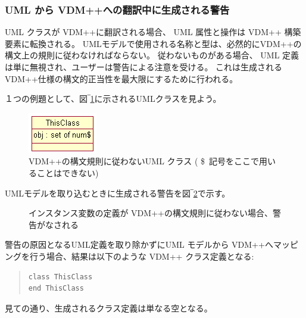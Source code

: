 \documentclass[\pformat,12pt]{jarticle}
\newcommand{\vdmpp}{VDM++}
\begin{document}
\subsubsection*{ UML から \vdmpp{}への翻訳中に生成される警告}


 UML クラスが \vdmpp{}に翻訳される場合、 UML 属性と操作は \vdmpp{} 構築要素に転換される。
UMLモデルで使用される名称と型は、必然的に\vdmpp{}の構文上の規則に従わなければならない。
従わないものがある場合、 UML 定義は単に無視され、ユーザーは警告による注意を受ける。
これは生成される \vdmpp{}仕様の構文的正当性を最大限にするために行われる。

１つの例題として、図‾\ref{fig:noncompliance}に示されるUMLクラスを見よう。

\begin{figure}[htb]
\begin{center}
\mbox{}
\vspace{0.5cm}
\includegraphics{noncompliance}
\caption{\vdmpp{}の構文規則に従わないUML クラス ( \$\ 記号をここで用いることはできない)　\label{fig:noncompliance}}
\end{center}
\end{figure}

UMLモデルを取り込むときに生成される警告を図‾\ref{fig:warning}で示す。

\begin{figure}[htb]
\begin{center}
\mbox{}
\vspace{0.5cm}
\caption{インスタンス変数の定義が \vdmpp{}の構文規則に従わない場合、警告がなされる　\label{fig:warning}}
\end{center}
\end{figure}
 警告の原因となるUML定義を取り除かずにUML モデルから \vdmpp{}へマッピングを行う場合、結果は以下のような \vdmpp{} クラス定義となる:

\begin{quote}
\begin{verbatim}
class ThisClass
end ThisClass
\end{verbatim}
\end{quote}

見ての通り、生成されるクラス定義は単なる空となる。
\end{document}
